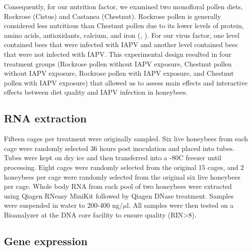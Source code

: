 \documentclass[11pt,a4paper,oldfontcommands,openany]{memoir}
\numberwithin{equation}{section} %
\begin{document}
Consequently, for our nutrition factor, we examined two monofloral pollen diets, Rockrose (Cistus) and Castanea (Chestnut). Rockrose pollen is generally considered less nutritious than Chestnut pollen due to its lower levels of protein, amino acids, antioxidants, calcium, and iron (\citealt{DiPasquale}, \citealt{adamInt}). For our virus factor, one level contained bees that were infected with IAPV and another level contained bees that were not infected with IAPV. This experimental design resulted in four treatment groups (Rockrose pollen without IAPV exposure, Chestnut pollen without IAPV exposure, Rockrose pollen with IAPV exposure, and Chestnut pollen with IAPV exposure) that allowed us to assess main effects and interactive effects between diet quality and IAPV infection in honeybees.

\subsection{RNA extraction}

Fifteen cages per treatment were originally sampled. Six live honeybees from each cage were randomly selected 36 hours post inoculation and placed into tubes. Tubes were kept on dry ice and then transferred into a -80C freezer until processing. Eight cages were randomly selected from the original 15 cages, and 2 honeybees per cage were randomly selected from the original six live honeybees per cage. Whole body RNA from each pool of two honeybees were extracted using Qiagen RNeasy MiniKit followed by Qiagen DNase treatment. Samples were suspended in water to 200-400 ng/$\mu$l. All samples were then tested on a Bioanalyzer at the DNA core facility to ensure quality (RIN>8).

\subsection{Gene expression}
\end{document}
